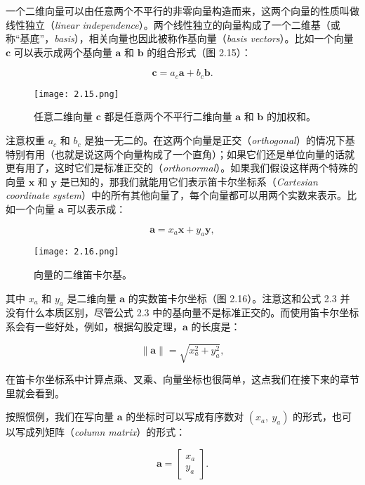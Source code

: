 \documentclass[lang=cn,12pt]{elegantbook}
\begin{document}
一个二维向量可以由任意两个不平行的非零向量构造而来，这两个向量的性质叫做线性独立（\textit{linear independence}）。两个线性独立的向量构成了一个二维基（或称“基底”，\textit{basis}），相关向量也因此被称作基向量（\textit{basis vectors}）。比如一个向量 $\mathbf{c}$ 可以表示成两个基向量 $\mathbf{a}$ 和 $\mathbf{b}$ 的组合形式（图 2.15）：

\begin{equation}
  \mathbf{c} = a_c\mathbf{a} + b_c\mathbf{b}.
\end{equation}

\begin{figure}[htbp]
  \centering
  \texttt{[image: 2.15.png]}
  \caption{任意二维向量 $\mathbf{c}$ 都是任意两个不平行二维向量 $\mathbf{a}$ 和 $\mathbf{b}$ 的加权和。}
\end{figure}

注意权重 $a_c$ 和 $b_c$ 是独一无二的。在这两个向量是正交（\textit{orthogonal}）的情况下基特别有用（也就是说这两个向量构成了一个直角）；如果它们还是单位向量的话就更有用了，这时它们是标准正交的（\textit{orthonormal}）。如果我们假设这样两个特殊的向量 $\mathbf{x}$ 和 $\mathbf{y}$ 是已知的，那我们就能用它们表示笛卡尔坐标系（\textit{Cartesian coordinate system}）中的所有其他向量了，每个向量都可以用两个实数来表示。比如一个向量 $\mathbf{a}$ 可以表示成：

$$
  \mathbf{a} = x_a\mathbf{x} + y_a\mathbf{y},
$$

\begin{figure}[htbp]
  \centering
  \texttt{[image: 2.16.png]}
  \caption{向量的二维笛卡尔基。}
\end{figure}

其中 $x_a$ 和 $y_a$ 是二维向量 $\mathbf{a}$ 的实数笛卡尔坐标（图 2.16）。注意这和公式 2.3 并没有什么本质区别，尽管公式 2.3 中的基向量不是标准正交的。而使用笛卡尔坐标系会有一些好处，例如，根据勾股定理，$\mathbf{a}$ 的长度是：

$$
  \| \mathbf{a} \| = \sqrt{x_a^2 + y_a^2},
$$

在笛卡尔坐标系中计算点乘、叉乘、向量坐标也很简单，这点我们在接下来的章节里就会看到。

按照惯例，我们在写向量 $\mathbf{a}$ 的坐标时可以写成有序数对 $(x_a,\ y_a)$ 的形式，也可以写成列矩阵（\textit{column matrix}）的形式：

$$
  \mathbf{a} = \begin{bmatrix}
    x_a \\
    y_a
  \end{bmatrix}.
$$
\end{document}
